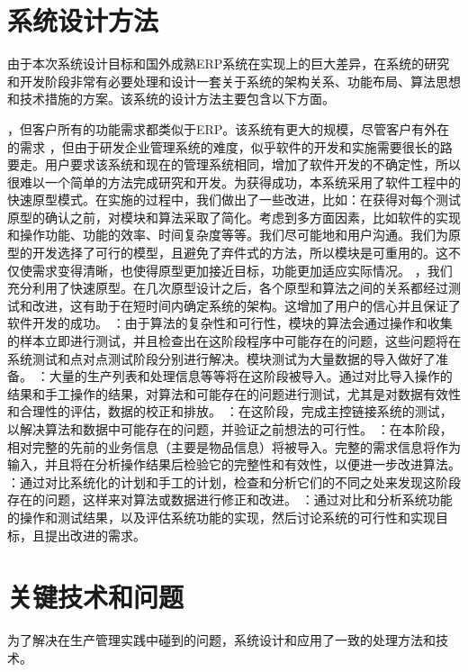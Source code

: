 \section{系统设计方法}

由于本次系统设计目标和国外成熟ERP系统在实现上的巨大差异，在系统的研究和开发阶段非常有必要处理和设计一套关于系统的架构关系、功能布局、算法思想和技术措施的方案。该系统的设计方法主要包含以下方面。
\begin{itemize}
，但客户所有的功能需求都类似于ERP。该系统有更大的规模，尽管客户有外在的需求 ，但由于研发企业管理系统的难度，似乎软件的开发和实施需要很长的路要走。用户要求该系统和现在的管理系统相同，增加了软件开发的不确定性，所以很难以一个简单的方法完成研究和开发。为获得成功，本系统采用了软件工程中的快速原型模式。在实施的过程中，我们做出了一些改进，比如：在获得对每个测试原型的确认之前，对模块和算法采取了简化。考虑到多方面因素，比如软件的实现和操作功能、功能的效率、时间复杂度等等。我们尽可能地和用户沟通。我们为原型的开发选择了可行的模型，且避免了弃件式的方法，所以模块是可重用的。这不仅使需求变得清晰，也使得原型更加接近目标，功能更加适应实际情况。
，我们充分利用了快速原型。在几次原型设计之后，各个原型和算法之间的关系都经过测试和改进，这有助于在短时间内确定系统的架构。这增加了用户的信心并且保证了软件开发的成功。
：由于算法的复杂性和可行性，模块的算法会通过操作和收集的样本立即进行测试，并且检查出在这阶段程序中可能存在的问题，这些问题将在系统测试和点对点测试阶段分别进行解决。模块测试为大量数据的导入做好了准备。
：大量的生产列表和处理信息等等将在这阶段被导入。通过对比导入操作的结果和手工操作的结果，对算法和可能存在的问题进行测试，尤其是对数据有效性和合理性的评估，数据的校正和排放。
：在这阶段，完成主控链接系统的测试，以解决算法和数据中可能存在的问题，并验证之前想法的可行性。
：在本阶段，相对完整的先前的业务信息（主要是物品信息）将被导入。完整的需求信息将作为输入，并且将在分析操作结果后检验它的完整性和有效性，以便进一步改进算法。
：通过对比系统化的计划和手工的计划，检查和分析它们的不同之处来发现这阶段存在的问题，这样来对算法或数据进行修正和改进。
：通过对比和分析系统功能的操作和测试结果，以及评估系统功能的实现，然后讨论系统的可行性和实现目标，且提出改进的需求。
\end{itemize}
\section{关键技术和问题}

为了解决在生产管理实践中碰到的问题，系统设计和应用了一致的处理方法和技术。

